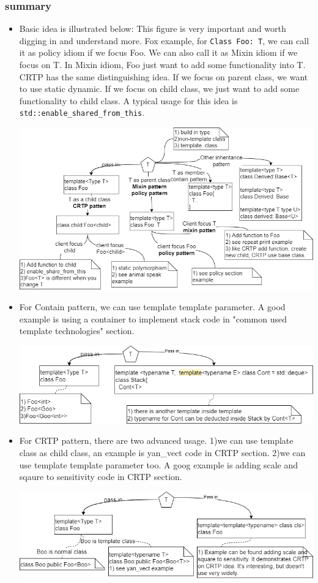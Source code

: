 \documentclass[a4paper,11pt,twoside]{book}
\begin{document}
\subsubsection{summary}
\begin{itemize}
	\item Basic idea is illustrated below: This figure is very important and worth digging in and understand more. Fox example, for \texttt{Class Foo: T}, we can call it as policy idiom if we focus Foo. We can also call it as Mixin idiom if we focus on T. In Mixin idiom, Foo just want to add some functionality into T. CRTP has the same distinguishing idea. If we focus on parent class, we want to use static dynamic. If we focus on child class, we just want to add some functionality to child class. A typical usage for this idea is \texttt{std::enable\_shared\_from\_this}. 

		\includegraphics[width=0.9\linewidth]{pics/template1.drawio.png}
		
	\item For Contain pattern, we can use template template parameter. A good example is using a container to implement stack code in  "common used template technologies" section.
	
		\includegraphics[width=0.9\linewidth]{pics/template2.drawio.png}
		
	\item For CRTP pattern, there are two advanced usage. 1)we can use template class as child class, an example is yan\_vect code in CRTP section.  2)we can use template template parameter too. A goog example is adding scale and sqaure to sensitivity code in CRTP section. 
	
		\includegraphics[width=0.9\linewidth]{pics/template3.drawio.png}

\end{itemize}
\end{document}
